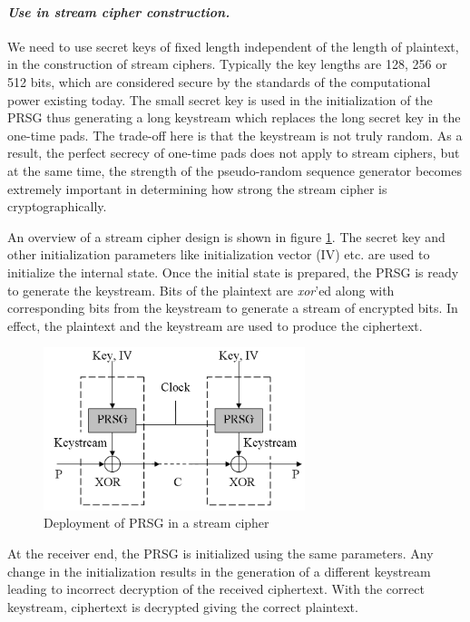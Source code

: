 \paragraph{\textit{Use in stream cipher construction.}}
\label{para:stream-construction} 
We need to use secret keys of fixed length independent of the length of plaintext, in the construction of stream ciphers. Typically the key lengths are 128, 256 or 512 bits, which are considered secure by the standards of the computational power existing today. 
The small secret key is used in the initialization of the PRSG thus generating a long keystream which replaces the long secret key in the one-time pads. The trade-off here is that the keystream is not truly random. As a result, the perfect secrecy of one-time pads does not apply to stream ciphers, but at the same time, the strength of the pseudo-random sequence generator becomes extremely important in determining how strong the stream cipher is cryptographically.

An overview of a stream cipher design is shown in figure \ref{fig:stream-cipher}. The secret key and other initialization parameters like initialization vector (IV) etc. are used to initialize the internal state. Once the initial state is prepared, the PRSG is ready to generate the keystream. Bits of the plaintext are \emph{xor}'ed along with corresponding bits from the keystream to generate a stream of encrypted bits. In effect, the plaintext and the keystream are used to produce the ciphertext.

\begin{figure}[ht!]
	\centering
		\includegraphics[width=3in]{./figures/stream-cipher.PNG}
	\caption{Deployment of PRSG in a stream cipher}	
	\label{fig:stream-cipher}
\end{figure}

At the receiver end, the PRSG is initialized using the same parameters. Any change in the initialization results in the generation of a different keystream leading to incorrect decryption of the received ciphertext. With the correct keystream, ciphertext is decrypted giving the correct plaintext. 

